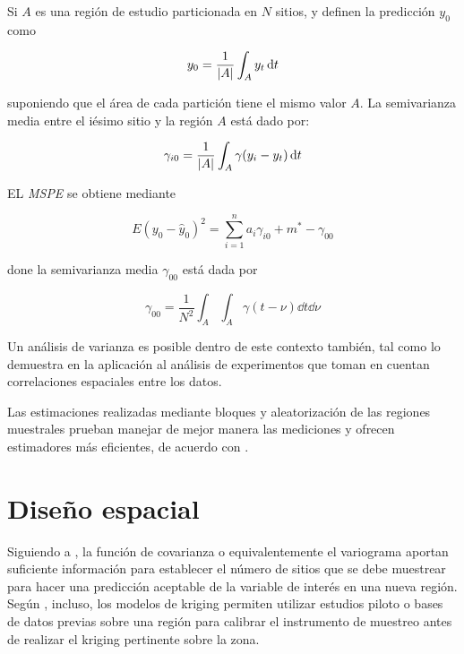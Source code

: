 \documentclass[14pt]{extarticle}
\begin{document}
Si $A$ es una región de estudio  particionada en $N$ sitios, \cite{Thompson.2012} y \cite{Grondona.1991} definen la predicción $y_0$ como

\begin{equation}
	y_0 = \frac{1}{\abs{A}} \int_{A} y_t \dd{t}
\end{equation}

\noindent suponiendo que el área de cada partición tiene el mismo valor $A$. La semivarianza media entre el iésimo sitio y la región $A$ está dado por:

\begin{equation}
	\gamma_{i0} = \frac{1}{\abs{A}} \int_{A}\gamma(y_i - y_t)\dd{t}
\end{equation}

EL \textit{MSPE} se obtiene mediante

\begin{equation}
	E\left(y_0 - \hat{y}_0\right)^2 = \sum_{i=1}^{n} a_i \gamma_{i0} + m^* - \gamma_{00}
\end{equation}

\noindent done la semivarianza media $\gamma_{00}$ está dada por

\begin{equation}
	\gamma_{00} = \frac{1}{N^2} \int_{A}\int_{A}\gamma(t-\nu)\dd{t}\dd{\nu}
\end{equation}

Un análisis de varianza es posible dentro de este contexto también, tal como lo demuestra \cite{Grondona.1991} en la aplicación al análisis de experimentos que toman en cuentan correlaciones espaciales entre los datos. 

Las estimaciones realizadas mediante bloques y aleatorización de las regiones muestrales prueban manejar de mejor manera las mediciones y ofrecen estimadores más eficientes, de acuerdo con \cite{Grondona.1991}. 

\section{Diseño espacial}
Siguiendo a \cite{Thompson.2012}, la función de covarianza o equivalentemente el variograma aportan suficiente información para establecer el número de sitios que se debe muestrear para hacer una predicción aceptable de la variable de interés en una nueva región. Según \cite{Cressie.1986}, incluso, los modelos de kriging permiten utilizar estudios piloto o bases de datos previas sobre una región para calibrar el instrumento de muestreo antes de realizar el kriging pertinente sobre la zona. 
\end{document}
